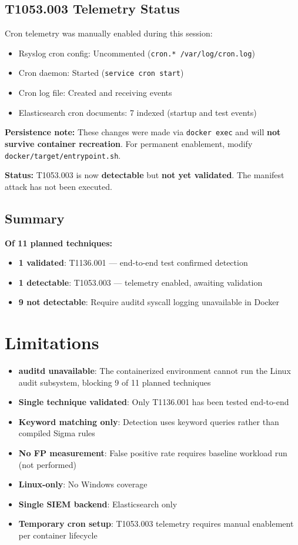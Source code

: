 \documentclass[11pt,a4paper]{article}
\begin{document}
\subsection{T1053.003 Telemetry Status}

Cron telemetry was manually enabled during this session:
\begin{itemize}
    \item Rsyslog cron config: Uncommented (\texttt{cron.* /var/log/cron.log})
    \item Cron daemon: Started (\texttt{service cron start})
    \item Cron log file: Created and receiving events
    \item Elasticsearch cron documents: 7 indexed (startup and test events)
\end{itemize}

\textbf{Persistence note:} These changes were made via \texttt{docker exec} and will \textbf{not survive container recreation}. For permanent enablement, modify \texttt{docker/target/entrypoint.sh}.

\textbf{Status:} T1053.003 is now \textbf{detectable} but \textbf{not yet validated}. The manifest attack has not been executed.

\subsection{Summary}

\textbf{Of 11 planned techniques:}
\begin{itemize}
    \item \textbf{1 validated}: T1136.001 --- end-to-end test confirmed detection
    \item \textbf{1 detectable}: T1053.003 --- telemetry enabled, awaiting validation
    \item \textbf{9 not detectable}: Require auditd syscall logging unavailable in Docker
\end{itemize}

\section{Limitations}

\begin{itemize}
    \item \textbf{auditd unavailable}: The containerized environment cannot run the Linux audit subsystem, blocking 9 of 11 planned techniques
    \item \textbf{Single technique validated}: Only T1136.001 has been tested end-to-end
    \item \textbf{Keyword matching only}: Detection uses keyword queries rather than compiled Sigma rules
    \item \textbf{No FP measurement}: False positive rate requires baseline workload run (not performed)
    \item \textbf{Linux-only}: No Windows coverage
    \item \textbf{Single SIEM backend}: Elasticsearch only
    \item \textbf{Temporary cron setup}: T1053.003 telemetry requires manual enablement per container lifecycle
\end{itemize}
\end{document}
